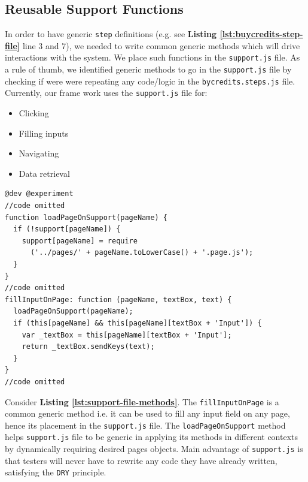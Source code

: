 \subsection{Reusable Support Functions}
\label{subsec:reusable-support-functions}

In order to have generic \texttt{step} definitions (e.g. see \textbf{Listing \ref{lst:buycredits-step-file}} line 3 and 7), we needed to write common generic methods which will drive interactions with the system. We place such functions in the \texttt{support.js} file. As a rule of thumb, we identified generic methods to go in the \texttt{support.js} file by checking if were were repeating any code/logic in the \texttt{bycredits.steps.js} file. Currently, our frame work uses the \texttt{support.js} file for:

\begin{itemize}
\item Clicking
\item Filling inputs
\item Navigating
\item Data retrieval
\end{itemize}

\begin{listing}[H]
\begin{verbatim}
@dev @experiment
//code omitted
function loadPageOnSupport(pageName) {
  if (!support[pageName]) {
    support[pageName] = require
      ('../pages/' + pageName.toLowerCase() + '.page.js');
  }
}
//code omitted
fillInputOnPage: function (pageName, textBox, text) {
  loadPageOnSupport(pageName);
  if (this[pageName] && this[pageName][textBox + 'Input']) {
    var _textBox = this[pageName][textBox + 'Input'];
    return _textBox.sendKeys(text);
  }
}
//code omitted
\end{verbatim}
\label{lst:support-file-methods}
\end{listing}

Consider \textbf{Listing \ref{lst:support-file-methods}}. The \texttt{fillInputOnPage} is a common generic method i.e. it can be used to fill any input field on any page, hence its placement in the \texttt{support.js} file. The \texttt{loadPageOnSupport} method helps \texttt{support.js} file to be generic in applying its methods in different contexts by dynamically requiring desired pages objects. Main advantage of \texttt{support.js} is that testers will never have to rewrite any code they have already written, satisfying the \texttt{DRY} principle.

